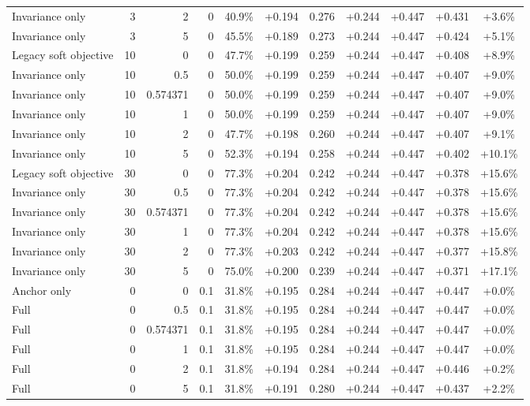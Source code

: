 \begin{table}[htbp]
\begin{tabular}{lrrrccccccc}
Invariance only & 3 & 2 & 0 & 40.9\% & +0.194 & 0.276 & +0.244 & +0.447 & +0.431 & +3.6\% \\
Invariance only & 3 & 5 & 0 & 45.5\% & +0.189 & 0.273 & +0.244 & +0.447 & +0.424 & +5.1\% \\
Legacy soft objective & 10 & 0 & 0 & 47.7\% & +0.199 & 0.259 & +0.244 & +0.447 & +0.408 & +8.9\% \\
Invariance only & 10 & 0.5 & 0 & 50.0\% & +0.199 & 0.259 & +0.244 & +0.447 & +0.407 & +9.0\% \\
Invariance only & 10 & 0.574371 & 0 & 50.0\% & +0.199 & 0.259 & +0.244 & +0.447 & +0.407 & +9.0\% \\
Invariance only & 10 & 1 & 0 & 50.0\% & +0.199 & 0.259 & +0.244 & +0.447 & +0.407 & +9.0\% \\
Invariance only & 10 & 2 & 0 & 47.7\% & +0.198 & 0.260 & +0.244 & +0.447 & +0.407 & +9.1\% \\
Invariance only & 10 & 5 & 0 & 52.3\% & +0.194 & 0.258 & +0.244 & +0.447 & +0.402 & +10.1\% \\
Legacy soft objective & 30 & 0 & 0 & 77.3\% & +0.204 & 0.242 & +0.244 & +0.447 & +0.378 & +15.6\% \\
Invariance only & 30 & 0.5 & 0 & 77.3\% & +0.204 & 0.242 & +0.244 & +0.447 & +0.378 & +15.6\% \\
Invariance only & 30 & 0.574371 & 0 & 77.3\% & +0.204 & 0.242 & +0.244 & +0.447 & +0.378 & +15.6\% \\
Invariance only & 30 & 1 & 0 & 77.3\% & +0.204 & 0.242 & +0.244 & +0.447 & +0.378 & +15.6\% \\
Invariance only & 30 & 2 & 0 & 77.3\% & +0.203 & 0.242 & +0.244 & +0.447 & +0.377 & +15.8\% \\
Invariance only & 30 & 5 & 0 & 75.0\% & +0.200 & 0.239 & +0.244 & +0.447 & +0.371 & +17.1\% \\
Anchor only & 0 & 0 & 0.1 & 31.8\% & +0.195 & 0.284 & +0.244 & +0.447 & +0.447 & +0.0\% \\
Full & 0 & 0.5 & 0.1 & 31.8\% & +0.195 & 0.284 & +0.244 & +0.447 & +0.447 & +0.0\% \\
Full & 0 & 0.574371 & 0.1 & 31.8\% & +0.195 & 0.284 & +0.244 & +0.447 & +0.447 & +0.0\% \\
Full & 0 & 1 & 0.1 & 31.8\% & +0.195 & 0.284 & +0.244 & +0.447 & +0.447 & +0.0\% \\
Full & 0 & 2 & 0.1 & 31.8\% & +0.194 & 0.284 & +0.244 & +0.447 & +0.446 & +0.2\% \\
Full & 0 & 5 & 0.1 & 31.8\% & +0.191 & 0.280 & +0.244 & +0.447 & +0.437 & +2.2\% \\

\end{tabular}
\end{table}
